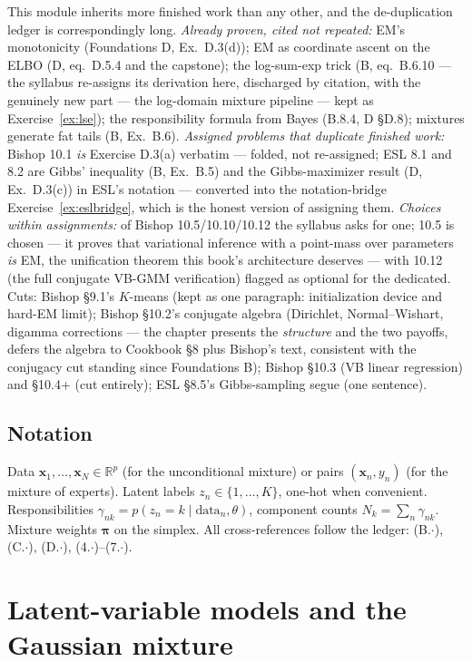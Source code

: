 \documentclass[11pt]{article}
\numberwithin{equation}{section}
\theoremstyle{plain}
\theoremstyle{definition}
\theoremstyle{remark}
\newcommand{\R}{\mathbb{R}}
\newcommand{\x}{\bm{x}}
\newcommand{\bpi}{\bm{\pi}}
\newcommand{\resp}{\gamma}
\begin{document}
This module inherits more finished work than any other, and the de-duplication ledger is correspondingly long. \emph{Already proven, cited not repeated:} EM's monotonicity (Foundations D, Ex.\ D.3(d)); EM as coordinate ascent on the ELBO (D, eq.\ D.5.4 and the capstone); the log-sum-exp trick (B, eq.\ B.6.10 --- the syllabus re-assigns its derivation here, discharged by citation, with the genuinely new part --- the log-domain mixture pipeline --- kept as Exercise~\ref{ex:lse}); the responsibility formula from Bayes (B.8.4, D \S D.8); mixtures generate fat tails (B, Ex.\ B.6). \emph{Assigned problems that duplicate finished work:} Bishop 10.1 \emph{is} Exercise D.3(a) verbatim --- folded, not re-assigned; ESL 8.1 and 8.2 are Gibbs' inequality (B, Ex.\ B.5) and the Gibbs-maximizer result (D, Ex.\ D.3(c)) in ESL's notation --- converted into the notation-bridge Exercise~\ref{ex:eslbridge}, which is the honest version of assigning them. \emph{Choices within assignments:} of Bishop 10.5/10.10/10.12 the syllabus asks for one; 10.5 is chosen --- it proves that variational inference with a point-mass over parameters \emph{is} EM, the unification theorem this book's architecture deserves --- with 10.12 (the full conjugate VB-GMM verification) flagged as optional for the dedicated. Cuts: Bishop \S9.1's $K$-means (kept as one paragraph: initialization device and hard-EM limit); Bishop \S10.2's conjugate algebra (Dirichlet, Normal--Wishart, digamma corrections --- the chapter presents the \emph{structure} and the two payoffs, defers the algebra to Cookbook \S8 plus Bishop's text, consistent with the conjugacy cut standing since Foundations B); Bishop \S10.3 (VB linear regression) and \S10.4+ (cut entirely); ESL \S8.5's Gibbs-sampling segue (one sentence).

\subsection*{Notation}

Data $\x_1, \dots, \x_N \in \R^p$ (for the unconditional mixture) or pairs $(\x_n, y_n)$ (for the mixture of experts). Latent labels $z_n \in \{1, \dots, K\}$, one-hot when convenient. Responsibilities $\resp_{nk} = p(z_n = k \mid \text{data}_n, \theta)$, component counts $N_k = \sum_n \resp_{nk}$. Mixture weights $\bpi$ on the simplex. All cross-references follow the ledger: (B.$\cdot$), (C.$\cdot$), (D.$\cdot$), (4.$\cdot$)--(7.$\cdot$).

\section{Latent-variable models and the Gaussian mixture}\label{sec:gmm}
\end{document}
